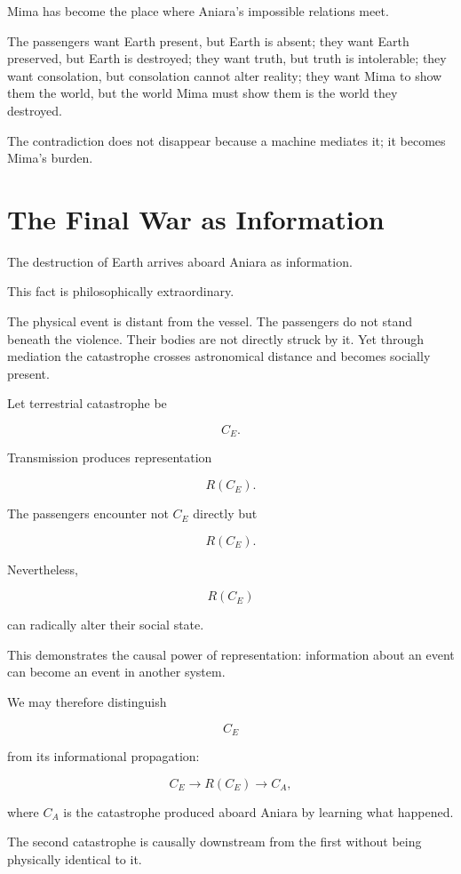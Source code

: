 \documentclass[11pt,oneside]{book}
\theoremstyle{definition}
\theoremstyle{remark}
\begin{document}
Mima has become the place where Aniara's impossible relations meet.

The passengers want Earth present, but Earth is absent; they want Earth preserved, but Earth is destroyed; they want truth, but truth is intolerable; they want consolation, but consolation cannot alter reality; they want Mima to show them the world, but the world Mima must show them is the world they destroyed.

The contradiction does not disappear because a machine mediates it; it becomes Mima's burden.

\section{The Final War as Information}

The destruction of Earth arrives aboard Aniara as information.

This fact is philosophically extraordinary.

The physical event is distant from the vessel. The passengers do not stand beneath the violence. Their bodies are not directly struck by it. Yet through mediation the catastrophe crosses astronomical distance and becomes socially present.

Let terrestrial catastrophe be

\[
C_E.
\]

Transmission produces representation

\[
R(C_E).
\]

The passengers encounter not \(C_E\) directly but

\[
R(C_E).
\]

Nevertheless,

\[
R(C_E)
\]

can radically alter their social state.

This demonstrates the causal power of representation: information about an event can become an event in another system.

We may therefore distinguish

\[
C_E
\]

from its informational propagation:

\[
C_E
\rightarrow
R(C_E)
\rightarrow
C_A,
\]

where \(C_A\) is the catastrophe produced aboard Aniara by learning what happened.

The second catastrophe is causally downstream from the first without being physically identical to it.
\end{document}
